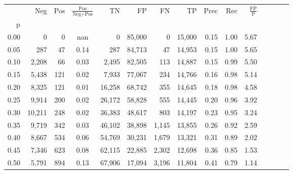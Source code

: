 \begin{tabular}{rrrcrrrrrrrrrrr}
\toprule
{} &     Neg &    Pos & $\frac{\text{Pos}}{\text{Neg}+\text{Pos}}$ &      TN &      FP &      FN &      TP &  Prec &   Rec & $\frac{\text{FP}}{\text{P}}$ \\
p    &         &        &                                            &         &         &         &         &       &       &                              \\
\midrule
0.00 &       0 &      0 &                                        nan &       0 &  85,000 &       0 &  15,000 &  0.15 &  1.00 &                         5.67 \\
0.05 &     287 &     47 &                                       0.14 &     287 &  84,713 &      47 &  14,953 &  0.15 &  1.00 &                         5.65 \\
0.10 &   2,208 &     66 &                                       0.03 &   2,495 &  82,505 &     113 &  14,887 &  0.15 &  0.99 &                         5.50 \\
0.15 &   5,438 &    121 &                                       0.02 &   7,933 &  77,067 &     234 &  14,766 &  0.16 &  0.98 &                         5.14 \\
0.20 &   8,325 &    121 &                                       0.01 &  16,258 &  68,742 &     355 &  14,645 &  0.18 &  0.98 &                         4.58 \\
0.25 &   9,914 &    200 &                                       0.02 &  26,172 &  58,828 &     555 &  14,445 &  0.20 &  0.96 &                         3.92 \\
0.30 &  10,211 &    248 &                                       0.02 &  36,383 &  48,617 &     803 &  14,197 &  0.23 &  0.95 &                         3.24 \\
0.35 &   9,719 &    342 &                                       0.03 &  46,102 &  38,898 &   1,145 &  13,855 &  0.26 &  0.92 &                         2.59 \\
0.40 &   8,667 &    534 &                                       0.06 &  54,769 &  30,231 &   1,679 &  13,321 &  0.31 &  0.89 &                         2.02 \\
0.45 &   7,346 &    623 &                                       0.08 &  62,115 &  22,885 &   2,302 &  12,698 &  0.36 &  0.85 &                         1.53 \\
0.50 &   5,791 &    894 &                                       0.13 &  67,906 &  17,094 &   3,196 &  11,804 &  0.41 &  0.79 &                         1.14 \\

\end{tabular}
